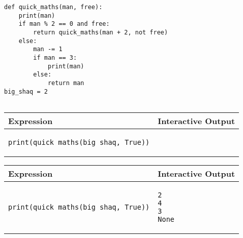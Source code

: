 \begin{blocksection}
\question

\begin{lstlisting}
def quick_maths(man, free):    
    print(man)
    if man % 2 == 0 and free:
        return quick_maths(man + 2, not free)
    else:
        man -= 1
        if man == 3:
            print(man)
        else:
            return man
big_shaq = 2
    
\end{lstlisting}

\begin{center}
\begin{tabular}{|p{10cm}|p{5cm}|} 
\hline
\textbf{Expression} & \textbf{Interactive Output} \\ 
\hline
\rule{0pt}{3ex}
\begin{lstlisting}
print(quick_maths(big_shaq, True))
\end{lstlisting}
&  \\ 
\hline
\end{tabular}
\end{center}


\begin{solution}[.1in]
\begin{center}
\begin{tabular}{|p{8cm}|p{6cm}|} 
\hline
\textbf{Expression} & \textbf{Interactive Output} \\ 
\hline
\rule{0pt}{4ex}
\begin{lstlisting}
print(quick_maths(big_shaq, True))
\end{lstlisting}
&  
\begin{lstlisting}
2
4
3
None
\end{lstlisting}\\ 
\hline
\end{tabular}
\end{center}

\end{solution}
\end{blocksection}
